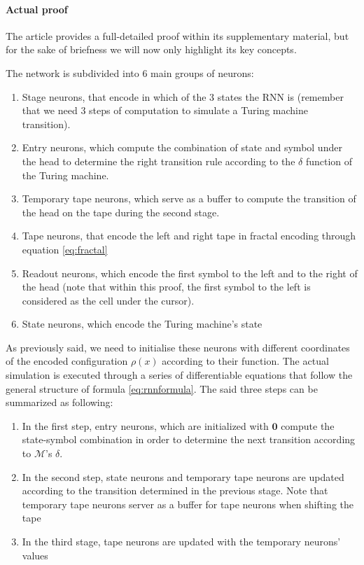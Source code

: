 \documentclass{article}
\begin{document}
\paragraph{Actual proof}
The article provides a full-detailed proof within its supplementary material, but for the sake of briefness we will now only highlight its key concepts.

The network is subdivided into 6 main groups of neurons:

\begin{enumerate}
    \item Stage neurons, that encode in which of the 3 states the RNN is (remember that we need 3 steps of computation to simulate a Turing machine transition).
    \item Entry neurons, which compute the combination of state and symbol under the head to determine the right transition rule according to the $\delta$ function of the Turing machine.
    \item Temporary tape neurons, which serve as a buffer to compute the transition of the head on the tape during the second stage.
    \item Tape neurons, that encode the left and right tape in fractal encoding through equation \ref{eq:fractal}
    \item Readout neurons, which encode the first symbol to the left and to the right of the head (note that within this proof, the first symbol to the left is considered as the cell under the cursor).
    \item State neurons, which encode the Turing machine's state
\end{enumerate}

As previously said, we need to initialise these neurons with different coordinates of the encoded configuration $\rho(x)$ according to their function. The actual simulation is executed through a series of differentiable equations that follow the general structure of formula \ref{eq:rnnformula}. The said three steps can be summarized as following:

\begin{enumerate}
    \item In the first step, entry neurons, which are initialized with $\mathbf{0}$ compute the state-symbol combination in order to determine the next transition according to $\mathcal{M}$'s $\delta$.
    \item In the second step, state neurons and temporary tape neurons are updated according to the transition determined in the previous stage. Note that temporary tape neurons server as a buffer for tape neurons when shifting the tape
    \item In the third stage, tape neurons are updated with the temporary neurons' values
\end{enumerate}
\end{document}
